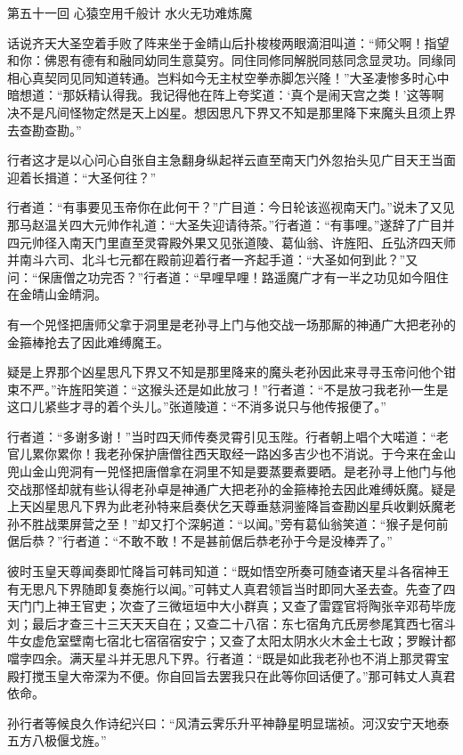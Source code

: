 \documentclass[12pt,UTF8]{ctexbook}
\begin{document}
第五十一回 心猿空用千般计 水火无功难炼魔

话说齐天大圣空着手败了阵来坐于金皘山后扑梭梭两眼滴泪叫道：“师父啊！指望和你：佛恩有德有和融同幼同生意莫穷。同住同修同解脱同慈同念显灵功。同缘同相心真契同见同知道转通。岂料如今无主杖空拳赤脚怎兴隆！”大圣凄惨多时心中暗想道：“那妖精认得我。我记得他在阵上夸奖道：‘真个是闹天宫之类！’这等啊决不是凡间怪物定然是天上凶星。想因思凡下界又不知是那里降下来魔头且须上界去查勘查勘。”

行者这才是以心问心自张自主急翻身纵起祥云直至南天门外忽抬头见广目天王当面迎着长揖道：“大圣何往？”

行者道：“有事要见玉帝你在此何干？”广目道：今日轮该巡视南天门。”说未了又见那马赵温关四大元帅作礼道：“大圣失迎请待茶。”行者道：“有事哩。”遂辞了广目并四元帅径入南天门里直至灵霄殿外果又见张道陵、葛仙翁、许旌阳、丘弘济四天师并南斗六司、北斗七元都在殿前迎着行者一齐起手道：“大圣如何到此？”又问：“保唐僧之功完否？”行者道：“早哩早哩！路遥魔广才有一半之功见如今阻住在金皘山金皘洞。

有一个兕怪把唐师父拿于洞里是老孙寻上门与他交战一场那厮的神通广大把老孙的金箍棒抢去了因此难缚魔王。

疑是上界那个凶星思凡下界又不知是那里降来的魔头老孙因此来寻寻玉帝问他个钳束不严。”许旌阳笑道：“这猴头还是如此放刁！”行者道：“不是放刁我老孙一生是这口儿紧些才寻的着个头儿。”张道陵道：“不消多说只与他传报便了。”

行者道：“多谢多谢！”当时四天师传奏灵霄引见玉陛。行者朝上唱个大喏道：“老官儿累你累你！我老孙保护唐僧往西天取经一路凶多吉少也不消说。于今来在金山兜山金山兜洞有一兕怪把唐僧拿在洞里不知是要蒸要煮要晒。是老孙寻上他门与他交战那怪却就有些认得老孙卓是神通广大把老孙的金箍棒抢去因此难缚妖魔。疑是上天凶星思凡下界为此老孙特来启奏伏乞天尊垂慈洞鉴降旨查勘凶星兵收剿妖魔老孙不胜战栗屏营之至！”却又打个深躬道：“以闻。”旁有葛仙翁笑道：“猴子是何前倨后恭？”行者道：“不敢不敢！不是甚前倨后恭老孙于今是没棒弄了。”

彼时玉皇天尊闻奏即忙降旨可韩司知道：“既如悟空所奏可随查诸天星斗各宿神王有无思凡下界随即复奏施行以闻。”可韩丈人真君领旨当时即同大圣去查。先查了四天门门上神王官吏；次查了三微垣垣中大小群真；又查了雷霆官将陶张辛邓苟毕庞刘；最后才查三十三天天天自在；又查二十八宿：东七宿角亢氏房参尾箕西七宿斗牛女虚危室壁南七宿北七宿宿宿安宁；又查了太阳太阴水火木金土七政；罗睺计都噹孛四余。满天星斗并无思凡下界。行者道：“既是如此我老孙也不消上那灵霄宝殿打搅玉皇大帝深为不便。你自回旨去罢我只在此等你回话便了。”那可韩丈人真君依命。

孙行者等候良久作诗纪兴曰：“风清云霁乐升平神静星明显瑞祯。河汉安宁天地泰五方八极偃戈旌。”
\end{document}
